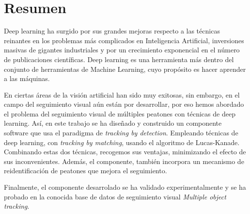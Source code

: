 \chapter*{Resumen}

Deep learning ha surgido por sus grandes mejoras respecto a las técnicas reinantes en los problemas más complicados en Inteligencia Artificial, inversiones masivas de gigantes industriales y por un crecimiento exponencial en el número de publicaciones científicas. Deep learning es una herramienta más dentro del conjunto de herramientas de Machine Learning, cuyo propósito es hacer aprender a las máquinas.

En ciertas áreas de la visión artificial han sido muy exitosas, sin embargo, en el campo del seguimiento visual aún están por desarrollar, por eso hemos abordado el problema del seguimiento visual de múltiples peatones con técnicas de deep learning. Así, en este trabajo se ha diseñado y construido un componente software que usa el paradigma de \textit{tracking by detection}. Empleando técnicas de deep learning, con \textit{tracking by matching}, usando el algoritmo de Lucas-Kanade. Combinando estas dos técnicas, recogemos sus ventajas, minimizando el efecto de sus inconvenientes. Además, el componente, también incorpora un mecanismo de reidentificación de peatones que mejora el seguimiento.

Finalmente, el componente desarrolado se ha validado experimentalmente y se ha probado en la conocida base de datos de seguimiento visual \textit{Multiple object tracking}.
